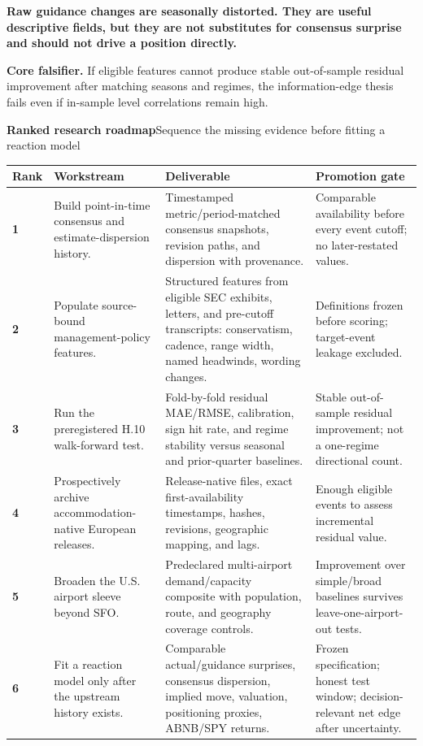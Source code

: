 \documentclass[10pt,letterpaper]{article}
\newcommand{\PageTitle}[2]{%
  {\color{ICNavy}\fontsize{16}{18}\selectfont\bfseries #1}\hfill{\color{ICMuted}\scriptsize #2}\par
  \vspace{2pt}{\color{ICNavy}\rule{\textwidth}{1.25pt}}\vspace{4pt}
}
\newcommand{\Callout}[2]{%
  \colorbox{#1!9}{\parbox{0.965\textwidth}{\vspace{3pt}\textcolor{#1}{\bfseries #2}\vspace{3pt}}}
}
\begin{document}
\Callout{ICAmber}{Raw guidance changes are seasonally distorted. They are useful descriptive fields, but they are not substitutes for consensus surprise and should not drive a position directly.}

\vfill
{\scriptsize\color{ICMuted}\textbf{Core falsifier.} If eligible features cannot produce stable out-of-sample residual improvement after matching seasons and regimes, the information-edge thesis fails even if in-sample level correlations remain high.}

\clearpage

\PageTitle{Ranked research roadmap}{Sequence the missing evidence before fitting a reaction model}

{\fontsize{7.15}{8.6}\selectfont
\begin{tabularx}{\textwidth}{p{} p{} p{} Y}
\toprule
{}Rank & Workstream & Deliverable & Promotion gate \\
\midrule
\textbf{1} & Build point-in-time consensus and estimate-dispersion history. & Timestamped metric/period-matched consensus snapshots, revision paths, and dispersion with provenance. & Comparable availability before every event cutoff; no later-restated values. \\
\textbf{2} & Populate source-bound management-policy features. & Structured features from eligible SEC exhibits, letters, and pre-cutoff transcripts: conservatism, cadence, range width, named headwinds, wording changes. & Definitions frozen before scoring; target-event leakage excluded. \\
\textbf{3} & Run the preregistered H.10 walk-forward test. & Fold-by-fold residual MAE/RMSE, calibration, sign hit rate, and regime stability versus seasonal and prior-quarter baselines. & Stable out-of-sample residual improvement; not a one-regime directional count. \\
\textbf{4} & Prospectively archive accommodation-native European releases. & Release-native files, exact first-availability timestamps, hashes, revisions, geographic mapping, and lags. & Enough eligible events to assess incremental residual value. \\
\textbf{5} & Broaden the U.S. airport sleeve beyond SFO. & Predeclared multi-airport demand/capacity composite with population, route, and geography coverage controls. & Improvement over simple/broad baselines survives leave-one-airport-out tests. \\
\textbf{6} & Fit a reaction model only after the upstream history exists. & Comparable actual/guidance surprises, consensus dispersion, implied move, valuation, positioning proxies, ABNB/SPY returns. & Frozen specification; honest test window; decision-relevant net edge after uncertainty. \\
\bottomrule
\end{tabularx}}
\end{document}
